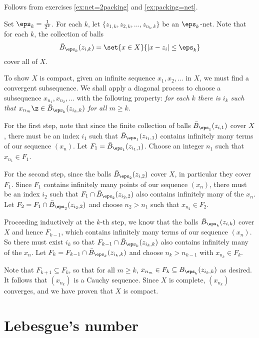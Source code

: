 Follows from exercises \ref{ex:net=2packing} and \ref{ex:packing=net}.

Set $\eps_k=\frac1{2^k}$.
For each $k$, 
let $\{z_{1,k},z_{2,k},\dots,z_{n_k,k}\}$ be an $\eps_k$-net.
Note that for each $k$, the collection of balls
$$\bar B_{\eps_k}(z_{i,k})=\set{x\in X}{|x-z_i|\le \eps_k}$$
cover all of $X$.

To show $X$ is compact, given an infinite sequence $x_1,x_2,\dots$ in $X$, we must find a convergent subsequence.
We shall apply a diagonal process to choose a subsequence
$x_{n_1},x_{n_2},\dots$  with the following property:
\textit{for each $k$ there is $i_k$ such that
$x_{n_m}\z\in\bar  B_{\eps_k}(z_{i_k,k})$ for all $m\ge k$}.

For the first step, note that since the finite collection of balls $\bar B_{\eps_1}(z_{i,1})$ cover $X$, there must be an index $i_1$ such that $\bar B_{\eps_1}(z_{i_1,1})$ contains infinitely many terms of our sequence $(x_n)$.  Let $F_1 = \bar B_{\eps_1}(z_{i_1,1})$. Choose an integer $n_1$ such that $x_{n_1} \in F_1$.

For the second step, since the balls $\bar B_{\eps_2}(z_{i,2})$ cover $X$, in particular they cover $F_1$.  Since $F_1$ contains infinitely many points of our sequence $(x_n)$, there must be an index $i_2$ such that $F_1 \cap \bar B_{\eps_2}(z_{i_2,2})$ also contains infinitely many of the $x_n$.  Let $F_2 = F_1 \cap \bar B_{\eps_2}(z_{i_2,2})$ and choose $n_2 > n_1$ such that $x_{n_2} \in F_2$.

Proceeding inductively at the $k$-th step, we know that the balls $\bar B_{\eps_k}(z_{i,k})$ cover $X$ and hence $F_{k-1}$, which contains infinitely many terms of our sequence $(x_n)$.  So there must exist $i_k$ so that $F_{k-1} \cap \bar B_{\eps_k}(z_{i_k,k})$ also contains infinitely many of the $x_n$.  Let $F_k = F_{k-1} \cap \bar B_{\eps_k}(z_{i_k,k})$ and choose $n_k > n_{k-1}$ with $x_{n_k} \in F_k$.

Note that $F_{k+1} \subseteq F_k$, so that for all $m \geq k$, $x_{n_m} \in F_k \subseteq B_{\eps_k}(z_{i_k,k})$ as desired.  It follows that $(x_{n_k})$ is a Cauchy sequence.
Since $X$ is complete, 
$(x_{n_k})$ converges, and we have proven that $X$ is compact.
\qeds

\section*{Lebesgue's number}

